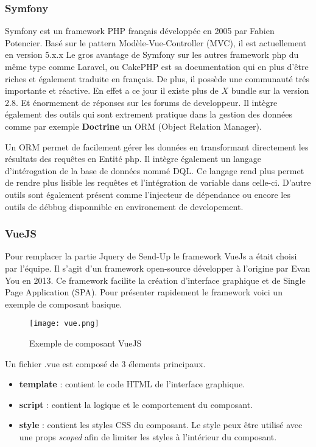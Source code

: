 \subsubsection{Symfony}
Symfony est un framework PHP français développée en 2005 par Fabien Potencier. Basé sur le pattern Modèle-Vue-Controller (MVC), il est actuellement en version 5.x.x  Le gros avantage de Symfony sur les autres framework php du même type comme Laravel, ou CakePHP est sa documentation qui en plus d'être riches et également traduite en français. De plus, il possède une communauté trés importante et réactive. En effet a ce jour il existe plus de $X$ bundle sur la version 2.8. Et énormement de réponses sur les forums de developpeur. Il intègre également des outils qui sont extrement pratique dans la gestion des données comme par exemple \textbf{Doctrine} un ORM (Object Relation Manager).

Un ORM permet de facilement gérer les données en transformant directement les résultats des requêtes en Entité php. Il intègre également un langage d'intérogation de la base de données nommé DQL. Ce langage rend plus permet de rendre plus lisible les requêtes et l'intégration de variable dans celle-ci. D'autre outils sont également présent comme l'injecteur de dépendance ou encore les outils de débbug disponnible en environement de developement.  


\subsubsection{VueJS}
Pour remplacer la partie Jquery de Send-Up le framework VueJs a était choisi par l'équipe. Il s'agit d'un framework open-source développer à l'origine par Evan You en 2013. Ce framework facilite la création d'interface graphique et de Single Page Application (SPA). Pour présenter rapidement le framework voici un exemple de composant basique. 

\begin{figure}[htbp]
    \center
    \texttt{[image: vue.png]}
    \caption{Exemple de composant VueJS}
\end{figure}

Un fichier .vue est composé de 3 élements principaux.
\begin{itemize}
    \item \textbf{template} : contient le code HTML de l'interface graphique.
    \item \textbf{script} : contient la logique et le comportement du composant. 
    \item \textbf{style} : contient les styles CSS du composant. Le style peux être utilisé avec une props \textit{scoped} afin de limiter les styles à l'intérieur du composant.
\end{itemize}

